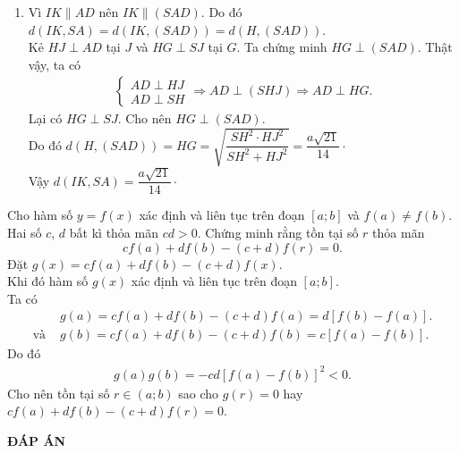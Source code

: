 \begin{bt}
{\begin{enumerate}
  Ta có $SI^2 + SK^2 = \left(\dfrac{a\sqrt{3}}{2}\right)^2 + \left(\dfrac{a}{2}\right)^2 = \dfrac{3a^2}{4} + \dfrac{a^2}{4} = a^2 = IK^2$. Nên tam giác $SIK$ vuông tại $S$. Khi đó
  $$SH = \sqrt{\dfrac{SI^2 \cdot SK^2}{SI^2 + SK^2}} = \dfrac{a\sqrt{3}}{4}.$$
  Trong tam giác vuông $SDH$ có
  \begin{align*}
   & \sin \widehat{SDH} = \dfrac{SH}{SD} = \dfrac{a\sqrt{3}}{4} : \dfrac{a\sqrt{2}}{2} = \dfrac{\sqrt{6}}{4}\cdot\\
   \Rightarrow & \widehat{SDH} = \arcsin \dfrac{\sqrt{6}}{4}\cdot
  \end{align*}
  Vậy góc giữa $SD$ và mặt phẳng đáy $(ABCD)$ bằng $\arcsin \dfrac{\sqrt{6}}{4}\cdot$
  \item Vì $IK \parallel AD$ nên $IK \parallel (SAD)$. Do đó $d(IK,SA) = d(IK,(SAD)) = d(H,(SAD))$.\\
  Kẻ $HJ \perp AD$ tại $J$ và $HG \perp SJ$ tại $G$. Ta chứng minh $HG \perp (SAD)$. Thật vậy, ta có
  \begin{align*}
   \begin{cases} AD \perp HJ \\ AD \perp SH \end{cases} \Rightarrow AD \perp (SHJ) \Rightarrow AD \perp HG.
  \end{align*}
  Lại có $HG \perp SJ$. Cho nên $HG \perp (SAD)$.\\
  Do đó $d(H,(SAD)) = HG = \sqrt{\dfrac{SH^2 \cdot HJ^2}{SH^2 + HJ^2}} = \dfrac{a\sqrt{21}}{14}\cdot$\\
  Vậy $d(IK,SA) = \dfrac{a\sqrt{21}}{14}\cdot$
 \end{enumerate}
 }
\end{bt}


\begin{bt}%
 Cho hàm số $y = f(x)$ xác định và liên tục trên đoạn $[a;b]$ và $f(a) \neq f(b)$. Hai số $c$, $d$ bất kì thỏa mãn $cd>0$. Chứng minh rằng tồn tại số $r$ thỏa mãn
 $$cf(a) + df(b) - (c+d)f(r) = 0.$$
 \loigiai
 {
 Đặt $g(x) = cf(a) + df(b) - (c+d)f(x)$.\\
 Khi đó hàm số $g(x)$ xác định và liên tục trên đoạn $[a;b]$.\\
 Ta có
 \begin{align*}
  			& g(a) = cf(a) + df(b) - (c+d)f(a) = d\left[f(b) - f(a)\right]. \\
  \text{và }& g(b) = cf(a) + df(b) - (c+d)f(b) = c\left[f(a) - f(b)\right].
 \end{align*}
 Do đó
 \begin{align*}
  g(a)g(b) = -cd\left[f(a) - f(b) \right]^2 < 0.
 \end{align*}
 Cho nên tồn tại số $r \in (a;b)$ sao cho $g(r) = 0$ hay $cf(a) + df(b) - (c+d)f(r) = 0$.
 }
\end{bt}
\newpage
\begin{center}
	\textbf{ĐÁP ÁN}
\end{center}
\begin{multicols}{10}
	 
\end{multicols}
